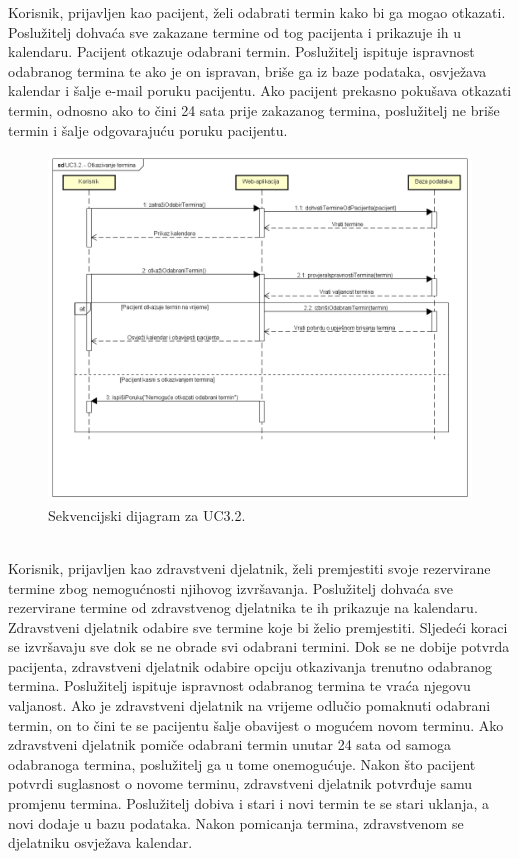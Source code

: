 Korisnik, prijavljen kao pacijent, želi odabrati termin kako bi ga mogao otkazati. Poslužitelj dohvaća sve zakazane termine od tog pacijenta i prikazuje ih u kalendaru. Pacijent otkazuje odabrani termin. Poslužitelj ispituje ispravnost odabranog termina te ako je on ispravan, briše ga iz baze podataka, osvježava kalendar i šalje e-mail poruku pacijentu. Ako pacijent prekasno pokušava otkazati termin, odnosno ako to čini 24 sata prije zakazanog termina, poslužitelj ne briše termin i šalje odgovarajuću poruku pacijentu.

\begin{figure}[H]
	\includegraphics[scale=0.5]{slike/UC3.2_Otkazivanje_termina}
	\centering
	\caption{Sekvencijski dijagram za UC3.2.}
\end{figure}

\newpage

\textbf{}\\

Korisnik, prijavljen kao zdravstveni djelatnik, želi premjestiti svoje rezervirane termine zbog nemogućnosti njihovog izvršavanja. Poslužitelj dohvaća sve rezervirane termine od zdravstvenog djelatnika te ih prikazuje na kalendaru. Zdravstveni djelatnik odabire sve termine koje bi želio premjestiti. Sljedeći koraci se izvršavaju sve dok se ne obrade svi odabrani termini. Dok se ne dobije potvrda pacijenta, zdravstveni djelatnik odabire opciju otkazivanja trenutno odabranog termina. Poslužitelj ispituje ispravnost odabranog termina te vraća njegovu valjanost. Ako je zdravstveni djelatnik na vrijeme odlučio pomaknuti odabrani termin, on to čini te se pacijentu šalje obavijest o mogućem novom terminu. Ako zdravstveni djelatnik pomiče odabrani termin unutar 24 sata od samoga odabranoga termina, poslužitelj ga u tome onemogućuje. Nakon što pacijent potvrdi suglasnost o novome terminu, zdravstveni djelatnik potvrđuje samu promjenu termina. Poslužitelj dobiva i stari i novi termin te se stari uklanja, a novi dodaje u bazu podataka. Nakon pomicanja termina, zdravstvenom se djelatniku osvježava kalendar.

